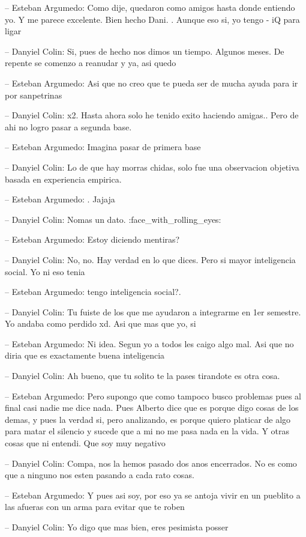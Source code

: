 -- Esteban Argumedo: Como dije, quedaron como amigos hasta donde
entiendo yo. Y me parece excelente. Bien hecho Dani. . Aunque eso si, yo
tengo - iQ para ligar

-- Danyiel Colin: Si, pues de hecho nos dimos un tiempo. Algunos meses.
De repente se comenzo a reanudar y ya, asi quedo

-- Esteban Argumedo: Asi que no creo que te pueda ser de mucha ayuda
para ir por sanpetrinas

-- Danyiel Colin: x2. Hasta ahora solo he tenido exito haciendo amigas..
Pero de ahi no logro pasar a segunda base.

-- Esteban Argumedo: Imagina pasar de primera base

-- Danyiel Colin: Lo de que hay morras chidas, solo fue una observacion
objetiva basada en experiencia empirica.

-- Esteban Argumedo: . Jajaja

-- Danyiel Colin: Nomas un dato. :face\_with\_rolling\_eyes:

-- Esteban Argumedo: Estoy diciendo mentiras?

-- Danyiel Colin: No, no. Hay verdad en lo que dices. Pero si mayor
inteligencia social. Yo ni eso tenia

-- Esteban Argumedo: tengo inteligencia social?.

-- Danyiel Colin: Tu fuiste de los que me ayudaron a integrarme en 1er
semestre. Yo andaba como perdido xd. Asi que mas que yo, si

-- Esteban Argumedo: Ni idea. Segun yo a todos les caigo algo mal. Asi
que no diria que es exactamente buena inteligencia

-- Danyiel Colin: Ah bueno, que tu solito te la pases tirandote es otra
cosa.

-- Esteban Argumedo: Pero supongo que como tampoco busco problemas pues
al final casi nadie me dice nada. Pues Alberto dice que es porque digo
cosas de los demas, y pues la verdad si, pero analizando, es porque
quiero platicar de algo para matar el silencio y sucede que a mi no me
pasa nada en la vida. Y otras cosas que ni entendi. Que soy muy negativo

-- Danyiel Colin: Compa, nos la hemos pasado dos anos encerrados. No es
como que a ninguno nos esten pasando a cada rato cosas.

-- Esteban Argumedo: Y pues asi soy, por eso ya se antoja vivir en un
pueblito a las afueras con un arma para evitar que te roben

-- Danyiel Colin: Yo digo que mas bien, eres pesimista posser

